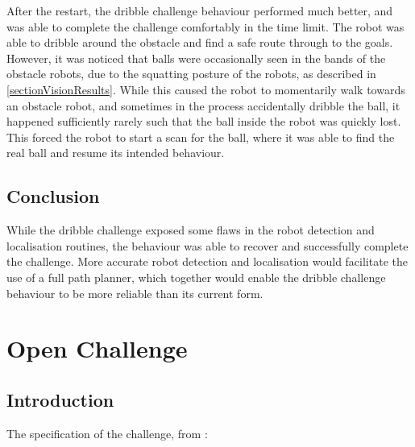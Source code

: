 \documentclass[pdftex,11pt,a4paper]{report}
\begin{document}
After the restart, the dribble challenge behaviour performed much better, and was able to complete the challenge comfortably in the time limit. The robot was able to dribble around the obstacle and find a safe route through to the goals. However, it was noticed that balls were occasionally seen in the bands of the obstacle robots, due to the squatting posture of the robots, as described in \autoref{sectionVisionResults}. While this caused the robot to momentarily walk towards an obstacle robot, and sometimes in the process accidentally dribble the ball, it happened sufficiently rarely such that the ball inside the robot was quickly lost. This forced the robot to start a scan for the ball, where it was able to find the real ball and resume its intended behaviour.
\subsection{Conclusion}
While the dribble challenge exposed some flaws in the robot detection and localisation routines, the behaviour was able to recover and successfully complete the challenge. More accurate robot detection and localisation would facilitate the use of a full path planner, which together would enable the dribble challenge behaviour to be more reliable than its current form.


\section{Open Challenge}
\subsection{Introduction}
The specification of the challenge, from \cite{ChallengeRules}:
\end{document}
